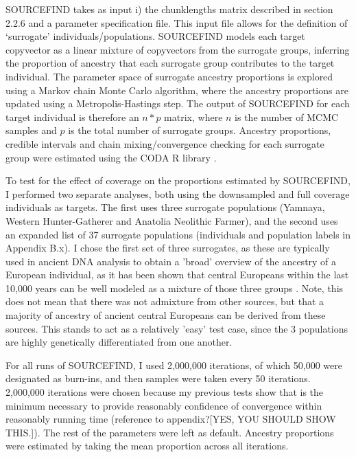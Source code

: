 SOURCEFIND takes as input i) the chunklengths matrix described in section 2.2.6 and a parameter specification file. This input file allows for the definition of `surrogate' individuals/populations. SOURCEFIND models each target copyvector as a linear mixture of copyvectors from the surrogate groups, inferring the proportion of ancestry that each surrogate group contributes to the target individual. The parameter space of surrogate ancestry proportions is explored using a Markov chain Monte Carlo algorithm, where the ancestry proportions are updated using a Metropolis-Hastings step. The output of SOURCEFIND for each target individual is therefore an $n*p$ matrix, where $n$ is the number of MCMC samples and $p$ is the total number of surrogate groups. Ancestry proportions, credible intervals and chain mixing/convergence checking for each surrogate group were estimated using the CODA R library \cite{oro22547}.

To test for the effect of coverage on the proportions estimated by SOURCEFIND, I performed two separate analyses, both using the downsampled and full coverage individuals as targets. The first uses three surrogate populations (Yamnaya, Western Hunter-Gatherer and Anatolia Neolithic Farmer), and the second uses an expanded list of 37 surrogate populations (individuals and population labels in Appendix B.x). I chose the first set of three surrogates, as these are typically used in ancient DNA analysis to obtain a 'broad' overview of the ancestry of a European individual, as it has been shown that central Europeans within the last 10,000 years can be well modeled as a mixture of those three groups \cite{Lazaridis2014, Haak2015}. Note, this does not mean that there was not admixture from other sources, but that a majority of ancestry of ancient central Europeans can be derived from these sources. This stands to act as a relatively 'easy' test case, since the 3 populations are highly genetically differentiated from one another.

For all runs of SOURCEFIND, I used 2,000,000 iterations, of which 50,000 were designated as burn-ins, and then samples were taken every 50 iterations. 2,000,000 iterations were chosen because my previous tests show that is the minimum necessary to provide reasonably confidence of convergence within reasonably running time (reference to appendix?{\color{red}[YES, YOU SHOULD SHOW THIS.]}). The rest of the parameters were left as default. Ancestry proportions were estimated by taking the mean proportion across all iterations. 

